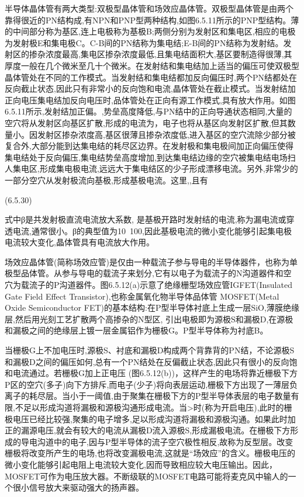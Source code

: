 半导体晶体管有两大类型:双极型晶体管和场效应晶体管。双极型晶体管是由两个靠得很近的PN结构成,有NPN和PNP型两种结构,如图6.5.11所示的PNP型结构。薄的中间部分称为基区,连上电极称为基极B;两侧分别为发射区和集电区,相应的电极为发射极E和集电极C。C-B间的PN结称为集电结;E-B间的PN结称为发射结。发射区的掺杂浓度最高,集电区掺杂浓度最低,且集电结面积大,基区要制造得很薄,其厚度一般在几个微米至几十个微米。在发射结和集电结加上适当的偏压可使双极型晶体管处在不同的工作模式。当发射结和集电结都加反向偏压时,两个PN结都处在反向截止状态,因此只有非常小的反向饱和电流,晶体管处在截止模式。当发射结加正向电压集电结加反向电压时,品体管处在正向有源工作模式,具有放大作用。如图6.5.11所示,发射结加正偏。,势垒高度降低,与PN结中的正向导通状态相同,大量的空穴将从发射区向基区扩散,形成的电流为，电子也将从基区向发射区扩散,但其数量小。因发射区掺杂浓度高,基区很薄且掺杂浓度低,进入基区的空穴流除少部分被复合外,大部分能到达集电结的耗尽区边界。在发射极和集电极间加正向偏压使得集电结处于反向偏压,集电结势垒高度增加,到达集电结边缘的空穴被集电结电场扫人集电区,形成集电极电流,远远大于集电结区的少子形成漂移电流。另外,非常少的一部分空穴从发射极流向基极,形成基极电流。这里,,且有

 	(6.5.30)

式中β是共发射极直流电流放大系数, 是基极开路时发射结的电流,称为漏电流或穿透电流,通常很小。β的典型值为10~100,因此基极电流的微小变化能够引起集电极电流较大变化,晶体管具有电流放大作用。



场效应晶体管(简称场效应管)是仅由一种载流子参与导电的半导体器件，也称为单极型品体管。从参与导电的载流子来划分,它有以电子为载流子的N沟道器件和空穴为载流子的P沟道器件。图6.5.12(a)示意了绝缘栅型场效应管IGFET(Insulated Gate Field Effect Transistor),也称金属氧化物半导体品体管 MOSFET(Metal Oxide Semiconductor FET)的基本结构:在P型半导体衬底上生成一层SiO,薄膜绝缘层,然后用光刻工艺扩散两个高掺杂的N型区, 引出电极即为源极S和漏极D,在源极和漏极之间的绝缘层上镀一层金属铝作为栅极G。P型半导体称为衬底B。



当栅极G上不加电压时,源极S、衬底和漏极D构成两个背靠背的PN结，不论源极S和漏极D之间的偏压如何,总有一个PN结处在反偏截止状态,因此只有很小的反向饱和电流通过。若栅极G加上正电压 (图6.5.12(b))，这样产生的电场将靠近栅极下方P区的空穴(多子)向下方排斥,而电子(少子)将向表层运动,栅极下方出现了一薄层负离子的耗尽层。当小于一阈值,由于聚集在栅极下方的P型半导体表层的电子数量有限,不足以形成沟道将漏极和源极沟通形成电流。当>时(称为开启电压),此时的栅极电压已经比较强,聚集的电子增多,足以形成沟道将漏极和源极沟通。如果此时加正的漏源电压,就会有较大的电流从漏极D流入源极S,形成漏极电流。在栅极下方形成的导电沟道中的电子,因与P型半导体的流子空穴极性相反,故称为反型层。改变栅极将改变所产生的电场,也将改变漏极电流,这就是“场效应”的含义。栅极电压的微小变化能够引起电阻上电流较大变化,因而导致相应较大电压输出。因此，MOSFET可作为电压放大器。不断级联的MOSFET电路可能将麦克风中输人的一个很小信号放大来驱动强大的扬声器。

